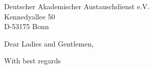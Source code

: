 \documentclass[
fontsize=12pt,
paper=a4,
enlargefirstpage=off,
firsthead=true,
fromalign=right,
fromrule=below,
firstfood=false,
pagenumber=false, %
parskip=half, %
foldmarks=false, %
addrfield=true, %
backaddress=false
]{scrlttr2}
\date{\today} %
\begin{document}

\begin{letter}{Deutscher Akademischer Austauschdienst e.V. \\
    Kennedyallee 50 \\ D-53175 Bonn} %


\opening{Dear Ladies and Gentlemen,}

\lipsum[1]{}

\lipsum[1]{}

\closing{With best regards}



\end{letter}
 
\end{document}
